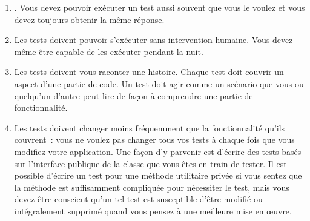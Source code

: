 \documentclass[a4paper,10pt,twoside]{book}
\begin{document}
\begin{enumerate}
\item {}. Vous devez pouvoir exécuter un test aussi souvent que vous le voulez et vous devez toujours obtenir la même réponse.


\item Les tests doivent pouvoir s'exécuter sans intervention humaine. Vous devez même être capable de les exécuter pendant la nuit.


\item Les tests doivent vous raconter une histoire.  Chaque test doit couvrir un aspect d'une partie de code. Un test doit agir comme un scénario que vous ou quelqu'un d'autre peut lire de façon à comprendre une partie de fonctionnalité.\label{prop:oneAspect} 


\item Les tests doivent changer moins fréquemment que la fonctionnalité qu'ils couvrent~: vous ne voulez pas changer tous vos tests à chaque fois que vous modifiez votre application. Une façon d'y parvenir est d'écrire des tests basés sur l'interface publique de la classe que vous êtes en train de tester. 
Il est possible d'écrire un test pour une méthode utilitaire privée si vous sentez que la méthode est suffisamment compliquée pour nécessiter le test, mais vous devez être conscient qu'un tel test est susceptible d'être modifié ou intégralement supprimé quand vous pensez à une meilleure mise en {\oe}uvre.
\end{enumerate}
\end{document}
